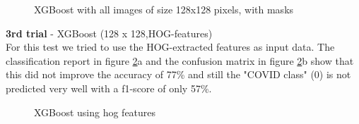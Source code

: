 \documentclass{article}
\begin{document}
\begin{figure}[!ht]
  \centering
  \qquad
  \caption{XGBoost with all images of size 128x128 pixels, with masks}
  \label{fig:XGBost_classifier_method_128_mask}
\end{figure}



\textbf{3rd trial} - XGBoost (128 x 128,HOG-features)\\
For this test we tried to use the HOG-extracted features as input data. The classification report in figure \ref{fig:XGBost_hog}a  and the confusion matrix
in figure \ref{fig:XGBost_hog}b show that this did not improve the accuracy of 77\% and still the "COVID class" (0) is not predicted very well with a f1-score of
only 57\%.

\begin{figure}[!ht]
  \centering
  \qquad
  \caption{XGBoost using hog features}
  \label{fig:XGBost_hog}
\end{figure}
\end{document}
